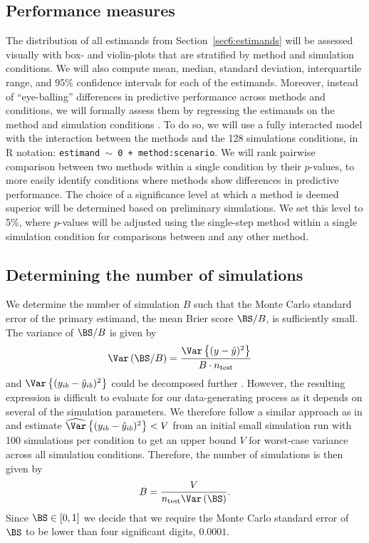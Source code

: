 \begin{subappendices}
\subsection{Performance measures} \label{sec6:performance}

The distribution of all estimands from Section~\ref{sec6:estimands} will be
assessed visually with box- and violin-plots that are stratified by method and
simulation conditions. We will also compute mean, median, standard deviation,
interquartile range, and 95\% confidence intervals for each of the estimands.
Moreover, instead of ``eye-balling'' differences in predictive performance
across methods and conditions, we will formally assess them by regressing the
estimands on the method and simulation conditions \citep[see][]{Skrondal2000}.
To do so, we will use a fully interacted model with the interaction between the
methods and the 128 simulations conditions, \ie in R notation: \texttt{estimand
  $\sim$ 0 + method:scenario}. We will rank pairwise comparison between two
methods within a single condition by their $p$-values, to more easily identify
conditions where methods show differences in predictive performance. The choice
of a significance level at which a method is deemed superior will be determined
based on preliminary simulations. We set this level to 5\%, where $p$-values
will be adjusted using the single-step method \citep{Hothorn2008} within a
single simulation condition for comparisons between \ainet{} and any other
method.


\subsection{Determining the number of simulations}

We determine the number of simulation $B$ such that the Monte Carlo standard
error of the primary estimand, the mean Brier score $\BS/B$, is sufficiently
small. The variance of $\BS/B$ is given by
\begin{align*}
  \Var\left(\BS/B\right)
  &= \frac{\Var\left\{(y -
    \hat{y})^{2}\right\}}{B \cdot n_{\text{test}}}
\end{align*}
and $\Var\left\{(y_{ib} - \hat{y}_{ib})^{2}\right\}$ could be decomposed further
\citep{Bradley2008}. However, the resulting expression is difficult to evaluate
for our data-generating process as it depends on several of the simulation
parameters. We therefore follow a similar approach as in \citet{Morris2019} and
estimate $\widehat{\Var}\left\{(y_{ib} - \hat{y}_{ib})^{2}\right\} < V$ from an
initial small simulation run with 100 simulations per condition to get an upper
bound $V$ for worst-case variance across all simulation conditions. Therefore,
the number of simulations is then given by
$$B = \frac{V}{n_{\text{test}} \Var\left(\BS\right)}.$$
Since $\BS \in [0, 1]$ we decide that we require the Monte Carlo standard error
of $\BS$ to be lower than four significant digits, $0.0001$.


\end{subappendices}
